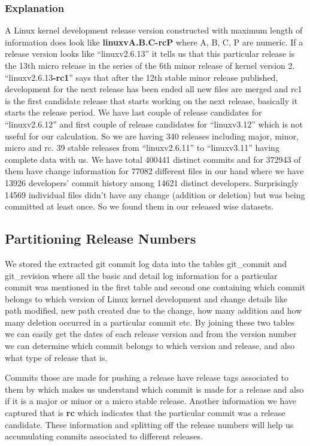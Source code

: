 \documentclass{acm_proc_article-sp}
\begin{document}
\subsubsection{Explanation}
A Linux kernel development release version constructed with maximum length of information does look like \textbf{linuxvA.B.C-rcP} where A, B, C, P are numeric. If a release version looks like ``linuxv2.6.13'' it tells us that this particular release is the 13th micro release in the series of the 6th minor release of kernel version 2. ``linuxv2.6.13\textbf{-rc1}'' says that after the 12th stable minor release published, development for the next release has been ended all new files are merged and rc1 is the first candidate release that starts working on the next release, basically it starts the release period. We have last couple of release candidates for ``linuxv2.6.12'' and first couple of release candidates for ``linuxv3.12'' which is not useful for our calculation. So we are having 340 releases including major, minor, micro and rc. 39 stable releases from ``linuxv2.6.11'' to ``linuxv3.11'' having complete data with us. We have total 400441 distinct commits and for 372943 of them have change information for 77082 different files in our hand where we have 13926 developers' commit history among 14621 distinct developers. Surprisingly 14569 individual files didn't have any change (addition or deletion) but was being committed at least once. So we found them in our released wise datasets.

 \subsection{Partitioning Release Numbers}
We stored the extracted git commit log data into the tables git\_commit and git\_revision where all the basic and detail log information for a particular commit was mentioned in the first table and second one containing which commit belongs to which version of Linux kernel development and change details like path modified, new path created due to the change, how many addition and how many deletion occurred in a particular commit etc. By joining these two tables we can easily get the dates of each release version and from the version number we can determine which commit belongs to which version and release, and also what type of release that is.

Commits those are made for pushing a release have release tags associated to them by which makes us understand which commit is made for a release and also if it is a major or minor or a micro stable release. Another information we have captured that is \textbf{rc} which indicates that the particular commit was a release candidate. These information and splitting off the release numbers will help us accumulating commits associated to different releases.
\end{document}
